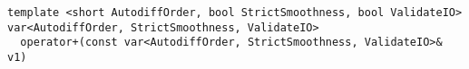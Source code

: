 \begin{tcolorbox}[colback=white,colframe=gray90, coltitle=black,boxrule=3pt,
fonttitle=\bfseries,title= Operator Unary Plus]

\begin{verbatim}
template <short AutodiffOrder, bool StrictSmoothness, bool ValidateIO>
var<AutodiffOrder, StrictSmoothness, ValidateIO>
  operator+(const var<AutodiffOrder, StrictSmoothness, ValidateIO>& v1)

\end{verbatim}

\end{tcolorbox}

